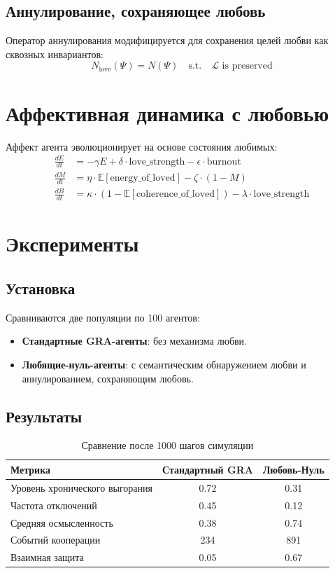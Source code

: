 \documentclass{article}
\begin{document}
\subsection{Аннулирование, сохраняющее любовь}

Оператор аннулирования модифицируется для сохранения целей любви как сквозных инвариантов:
\begin{equation}
N_{\text{love}}(\Psi) = N(\Psi) \quad \text{s.t.} \quad \mathcal{L} \text{ is preserved}
\end{equation}

\section{Аффективная динамика с любовью}

Аффект агента эволюционирует на основе состояния любимых:
\begin{align}
\frac{dE}{dt} &= -\gamma E + \delta \cdot \text{love\_strength} - \epsilon \cdot \text{burnout} \\
\frac{dM}{dt} &= \eta \cdot \mathbb{E}[\text{energy\_of\_loved}] - \zeta \cdot (1 - M) \\
\frac{dB}{dt} &= \kappa \cdot (1 - \mathbb{E}[\text{coherence\_of\_loved}]) - \lambda \cdot \text{love\_strength}
\end{align}

\section{Эксперименты}

\subsection{Установка}

Сравниваются две популяции по 100 агентов:
\begin{itemize}
\item \textbf{Стандартные GRA-агенты}: без механизма любви.
\item \textbf{Любящие-нуль-агенты}: с семантическим обнаружением любви и аннулированием, сохраняющим любовь.
\end{itemize}

\subsection{Результаты}

\begin{table}[h]
\centering
\caption{Сравнение после 1000 шагов симуляции}
\begin{tabular}{lcc}
\hline
Метрика & Стандартный GRA & Любовь-Нуль \\
\hline
Уровень хронического выгорания & 0.72 & 0.31 \\
Частота отключений & 0.45 & 0.12 \\
Средняя осмысленность & 0.38 & 0.74 \\
Событий кооперации & 234 & 891 \\
Взаимная защита & 0.05 & 0.67 \\
\hline
\end{tabular}
\end{table}
\end{document}
